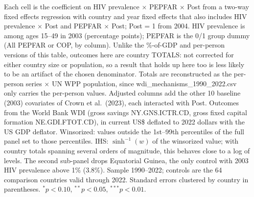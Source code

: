 \begin{table}[htbp]
\begin{minipage}{\textwidth}\footnotesize Each cell is the coefficient on HIV prevalence $\times$ PEPFAR $\times$ Post from a two-way fixed effects regression with country and year fixed effects that also includes HIV prevalence $\times$ Post and PEPFAR $\times$ Post; Post = 1 from 2004. HIV prevalence is among ages 15--49 in 2003 (percentage points); PEPFAR is the 0/1 group dummy (All PEPFAR or COP, by column). Unlike the $\%$-of-GDP and per-person versions of this table, outcomes here are country TOTALS: not corrected for either country size or population, so a result that holds up here too is less likely to be an artifact of the chosen denominator. Totals are reconstructed as the per-person series $\times$ UN WPP population, since wdi\_mechanisms\_1990\_2022.csv only carries the per-person values. Adjusted columns add the other 10 baseline (2003) covariates of Crown et al.\ (2023), each interacted with Post. Outcomes from the World Bank WDI (gross savings NY.GNS.ICTR.CD, gross fixed capital formation NE.GDI.FTOT.CD), in current US\$ deflated to 2022 dollars with the US GDP deflator. Winsorized: values outside the 1st--99th percentiles of the full panel set to those percentiles. IHS: $\sinh^{-1}(w)$ of the winsorized value; with country totals spanning several orders of magnitude, this behaves close to a log of levels. The second sub-panel drops Equatorial Guinea, the only control with 2003 HIV prevalence above 1\% (3.8\%). Sample 1990--2022; controls are the 64 comparison countries valid through 2022. Standard errors clustered by country in parentheses. $^{*}p<0.10$, $^{**}p<0.05$, $^{***}p<0.01$.\end{minipage}
\end{table}
